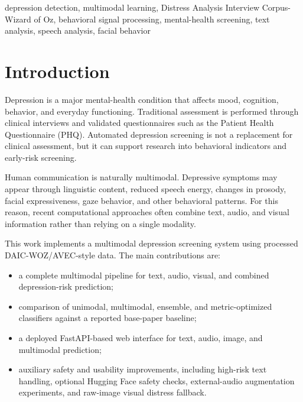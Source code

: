 \documentclass[conference]{IEEEtran}
\begin{document}
\begin{IEEEkeywords}
depression detection, multimodal learning, Distress Analysis Interview Corpus-Wizard of Oz, behavioral signal processing, mental-health screening, text analysis, speech analysis, facial behavior
\end{IEEEkeywords}

\section{Introduction}
Depression is a major mental-health condition that affects mood, cognition, behavior, and everyday functioning. Traditional assessment is performed through clinical interviews and validated questionnaires such as the Patient Health Questionnaire (PHQ). Automated depression screening is not a replacement for clinical assessment, but it can support research into behavioral indicators and early-risk screening.

Human communication is naturally multimodal. Depressive symptoms may appear through linguistic content, reduced speech energy, changes in prosody, facial expressiveness, gaze behavior, and other behavioral patterns. For this reason, recent computational approaches often combine text, audio, and visual information rather than relying on a single modality.

This work implements a multimodal depression screening system using processed DAIC-WOZ/AVEC-style data. The main contributions are:
\begin{itemize}
    \item a complete multimodal pipeline for text, audio, visual, and combined depression-risk prediction;
    \item comparison of unimodal, multimodal, ensemble, and metric-optimized classifiers against a reported base-paper baseline;
    \item a deployed FastAPI-based web interface for text, audio, image, and multimodal prediction;
    \item auxiliary safety and usability improvements, including high-risk text handling, optional Hugging Face safety checks, external-audio augmentation experiments, and raw-image visual distress fallback.
\end{itemize}
\end{document}
